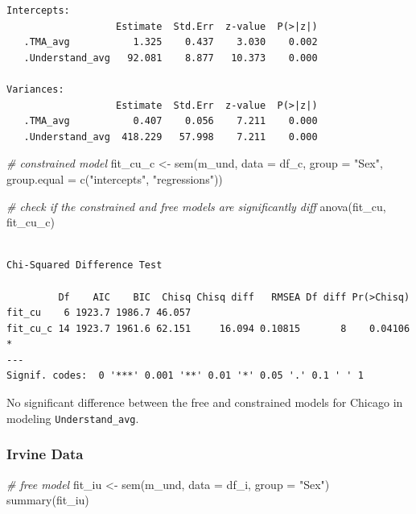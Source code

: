 \documentclass[
  letterpaper,
  DIV=11,
  numbers=noendperiod]{scrartcl}
\newenvironment{Shaded}{\begin{snugshade}}{\end{snugshade}}
\newcommand{\AttributeTok}[1]{\textcolor[rgb]{0.49,0.56,0.16}{#1}}
\newcommand{\CommentTok}[1]{\textcolor[rgb]{0.38,0.63,0.69}{\textit{#1}}}
\newcommand{\FunctionTok}[1]{\textcolor[rgb]{0.02,0.16,0.49}{#1}}
\newcommand{\NormalTok}[1]{\textcolor[rgb]{0.00,0.44,0.13}{#1}}
\newcommand{\OtherTok}[1]{\textcolor[rgb]{0.00,0.44,0.13}{#1}}
\newcommand{\StringTok}[1]{\textcolor[rgb]{0.25,0.44,0.63}{#1}}
\begin{document}
\begin{verbatim}
Intercepts:
                   Estimate  Std.Err  z-value  P(>|z|)
   .TMA_avg           1.325    0.437    3.030    0.002
   .Understand_avg   92.081    8.877   10.373    0.000

Variances:
                   Estimate  Std.Err  z-value  P(>|z|)
   .TMA_avg           0.407    0.056    7.211    0.000
   .Understand_avg  418.229   57.998    7.211    0.000
\end{verbatim}

\begin{Shaded}
\begin{Highlighting}[]
\CommentTok{\# constrained model}
\NormalTok{fit\_cu\_c }\OtherTok{\textless{}{-}} \FunctionTok{sem}\NormalTok{(m\_und, }\AttributeTok{data =}\NormalTok{ df\_c, }\AttributeTok{group =} \StringTok{"Sex"}\NormalTok{,}
                \AttributeTok{group.equal =} \FunctionTok{c}\NormalTok{(}\StringTok{"intercepts"}\NormalTok{, }\StringTok{"regressions"}\NormalTok{))}
\end{Highlighting}
\end{Shaded}

\begin{Shaded}
\begin{Highlighting}[]
\CommentTok{\# check if the constrained and free models are significantly diff}
\FunctionTok{anova}\NormalTok{(fit\_cu, fit\_cu\_c)}
\end{Highlighting}
\end{Shaded}

\begin{verbatim}

Chi-Squared Difference Test

         Df    AIC    BIC  Chisq Chisq diff   RMSEA Df diff Pr(>Chisq)  
fit_cu    6 1923.7 1986.7 46.057                                        
fit_cu_c 14 1923.7 1961.6 62.151     16.094 0.10815       8    0.04106 *
---
Signif. codes:  0 '***' 0.001 '**' 0.01 '*' 0.05 '.' 0.1 ' ' 1
\end{verbatim}

No significant difference between the free and constrained models for
Chicago in modeling \texttt{Understand\_avg}.

\hypertarget{irvine-data-1}{%
\subsubsection{Irvine Data}\label{irvine-data-1}}

\begin{Shaded}
\begin{Highlighting}[]
\CommentTok{\# free model}
\NormalTok{fit\_iu }\OtherTok{\textless{}{-}} \FunctionTok{sem}\NormalTok{(m\_und, }\AttributeTok{data =}\NormalTok{ df\_i, }\AttributeTok{group =} \StringTok{"Sex"}\NormalTok{)}
\FunctionTok{summary}\NormalTok{(fit\_iu)}
\end{Highlighting}
\end{Shaded}
\end{document}
